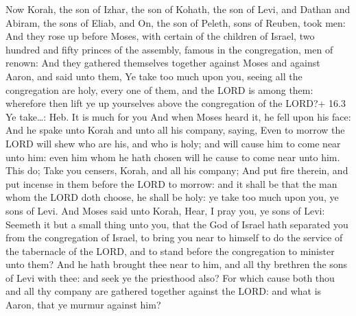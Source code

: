  Now Korah, the son of Izhar, the son of Kohath, the son of
Levi, and Dathan and Abiram, the sons of Eliab, and On, the son of
Peleth, sons of Reuben, took men:  And they rose up before
Moses, with certain of the children of Israel, two hundred and fifty
princes of the assembly, famous in the congregation, men of renown:
 And they gathered themselves together against Moses and
against Aaron, and said unto them, Ye take too much upon you, seeing all
the congregation are holy, every one of them, and the LORD is among
them: wherefore then lift ye up yourselves above the congregation of the
LORD?+ 16.3 Ye take\ldots: Heb. It is much for you  And when
Moses heard it, he fell upon his face:  And he spake unto
Korah and unto all his company, saying, Even to morrow the LORD will
shew who are his, and who is holy; and will cause him to come near unto
him: even him whom he hath chosen will he cause to come near unto him.
 This do; Take you censers, Korah, and all his company;
 And put fire therein, and put incense in them before the
LORD to morrow: and it shall be that the man whom the LORD doth choose,
he shall be holy: ye take too much upon you, ye sons of Levi.
 And Moses said unto Korah, Hear, I pray you, ye sons of
Levi:  Seemeth it but a small thing unto you, that the God
of Israel hath separated you from the congregation of Israel, to bring
you near to himself to do the service of the tabernacle of the LORD, and
to stand before the congregation to minister unto them? 
And he hath brought thee near to him, and all thy brethren the sons of
Levi with thee: and seek ye the priesthood also?  For which
cause both thou and all thy company are gathered together against the
LORD: and what is Aaron, that ye murmur against him?

